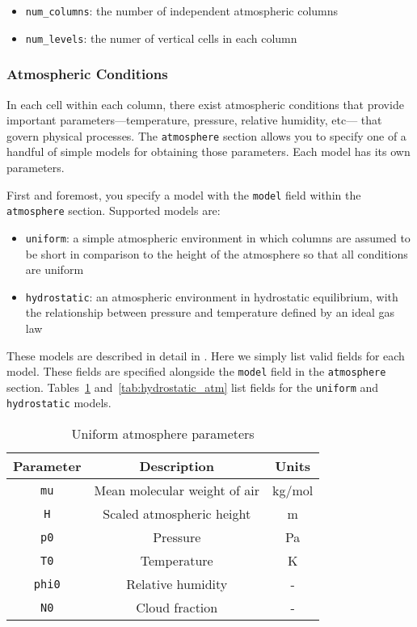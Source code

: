 \begin{itemize}
  \item \texttt{num\_columns}: the number of independent atmospheric columns
  \item \texttt{num\_levels}: the numer of vertical cells in each column
\end{itemize}

\subsubsection*{Atmospheric Conditions}

In each cell within each column, there exist atmospheric conditions that
provide important parameters---temperature, pressure, relative humidity, etc---
that govern physical processes. The \texttt{atmosphere} section allows you
to specify one of a handful of simple models for obtaining those parameters.
Each model has its own parameters.

First and foremost, you specify a model with the \texttt{model} field within
the \texttt{atmosphere} section. Supported models are:

\begin{itemize}
  \item \texttt{uniform}: a simple atmospheric environment in which columns are
    assumed to be short in comparison to the height of the atmosphere so that
    all conditions are uniform
  \item \texttt{hydrostatic}: an atmospheric environment in hydrostatic
    equilibrium, with the relationship between pressure and temperature defined
    by an ideal gas law
\end{itemize}

These models are described in detail in . Here we simply
list valid fields for each model. These fields are specified alongside the
\texttt{model} field in the \texttt{atmosphere} section. Tables~\ref{tab:uniform_atm}
and~\ref{tab:hydrostatic_atm} list fields for the \texttt{uniform} and
\texttt{hydrostatic} models.

\begin{table}[htbp]
\caption{Uniform atmosphere parameters}
\centering
\label{tab:uniform_atm}
\begin{tabular}{ccc}
  \toprule
  Parameter   & Description                  & Units   \\
  \midrule
  \texttt{mu}   & Mean molecular weight of air & kg/mol  \\
  \texttt{H}    & Scaled atmospheric height    & m       \\
  \texttt{p0}   & Pressure                     & Pa      \\
  \texttt{T0}   & Temperature                  & K       \\
  \texttt{phi0} & Relative humidity            & -       \\
  \texttt{N0}   & Cloud fraction               & -       \\
  \bottomrule
\end{tabular}
\end{table}

